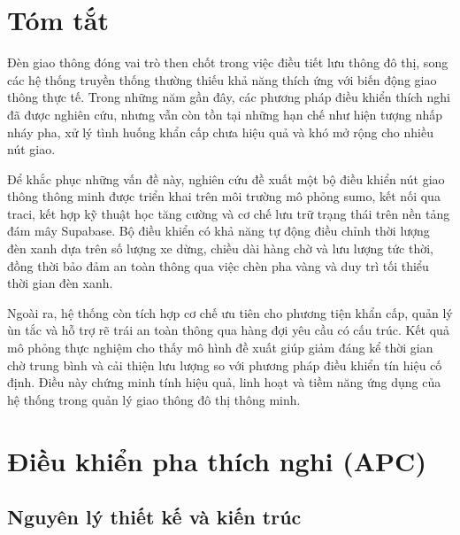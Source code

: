 \documentclass[12pt,a4paper,oneside]{report}
\begin{document}
\chapter*{Tóm tắt}
Đèn giao thông đóng vai trò then chốt trong việc điều tiết lưu thông đô thị, song các hệ thống truyền thống thường thiếu khả năng thích ứng với biến động giao thông thực tế. Trong những năm gần đây, các phương pháp điều khiển thích nghi đã được nghiên cứu, nhưng vẫn còn tồn tại những hạn chế như hiện tượng nhấp nháy pha, xử lý tình huống khẩn cấp chưa hiệu quả và khó mở rộng cho nhiều nút giao.

Để khắc phục những vấn đề này, nghiên cứu đề xuất một bộ điều khiển nút giao thông thông minh được triển khai trên môi trường mô phỏng \gls{sumo}, kết nối qua \gls{traci}, kết hợp kỹ thuật học tăng cường và cơ chế lưu trữ trạng thái trên nền tảng đám mây Supabase. Bộ điều khiển có khả năng tự động điều chỉnh thời lượng đèn xanh dựa trên số lượng xe dừng, chiều dài hàng chờ và lưu lượng tức thời, đồng thời bảo đảm an toàn thông qua việc chèn pha vàng và duy trì tối thiểu thời gian đèn xanh.

Ngoài ra, hệ thống còn tích hợp cơ chế ưu tiên cho phương tiện khẩn cấp, quản lý ùn tắc và hỗ trợ rẽ trái an toàn thông qua hàng đợi yêu cầu có cấu trúc. Kết quả mô phỏng thực nghiệm cho thấy mô hình đề xuất giúp giảm đáng kể thời gian chờ trung bình và cải thiện lưu lượng so với phương pháp điều khiển tín hiệu cố định. Điều này chứng minh tính hiệu quả, linh hoạt và tiềm năng ứng dụng của hệ thống trong quản lý giao thông đô thị thông minh.

\clearpage
{}







\chapter{Điều khiển pha thích nghi (APC)}

\section{Nguyên lý thiết kế và kiến trúc}
\end{document}
